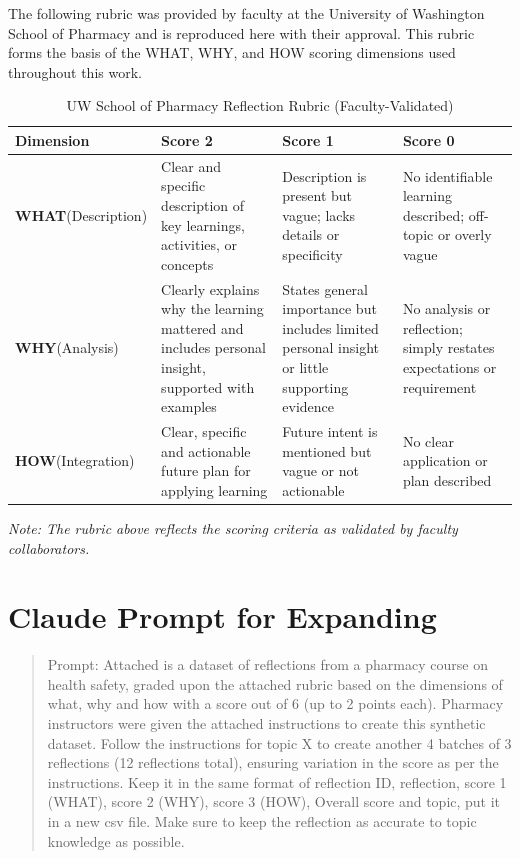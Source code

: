 \documentclass[11pt]{article}
\begin{document}
The following rubric was provided by faculty at the University of Washington School of Pharmacy and is reproduced here with their approval. This rubric forms the basis of the WHAT, WHY, and HOW scoring dimensions used throughout this work.

\vspace{1em}

\begin{table}[H]
\centering
\caption{UW School of Pharmacy Reflection Rubric (Faculty-Validated)}
\label{tab:rubric}
\begin{tabular}{p{2.2cm}p{3.8cm}p{3.8cm}p{3.8cm}}
\toprule
\textbf{Dimension} & \textbf{Score 2} & \textbf{Score 1} & \textbf{Score 0} \\
\midrule
\textbf{WHAT}\newline(Description) &
Clear and specific description of key learnings, activities, or concepts &
Description is present but vague; lacks details or specificity &
No identifiable learning described; off-topic or overly vague \\
\midrule
\textbf{WHY}\newline(Analysis) &
Clearly explains why the learning mattered and includes personal insight, supported with examples  &
States general importance but includes limited personal insight or little supporting evidence &
No analysis or reflection; simply restates expectations or requirement  \\
\midrule
\textbf{HOW}\newline(Integration) &
Clear, specific and actionable future plan for applying learning  &
Future intent is mentioned but vague or not actionable &
No clear application or plan described \\
\bottomrule
\end{tabular}
\end{table}

\noindent\textit{Note: The rubric above reflects the scoring criteria as validated by faculty collaborators.}

\section{Claude Prompt for Expanding}
\label{app:prompt}

\begin{quote}
    Prompt: Attached is a dataset of reflections from a pharmacy course on health safety, graded upon the attached rubric based on the dimensions of what, why and how with a score out of 6 (up to 2 points each). Pharmacy instructors were given the attached instructions to create this synthetic dataset. Follow the instructions for topic X to create another 4 batches of 3 reflections (12 reflections total), ensuring variation in the score as per the instructions. Keep it in the same format of reflection ID, reflection, score 1 (WHAT), score 2 (WHY), score 3 (HOW), Overall score and topic, put it in a new csv file. Make sure to keep the reflection as accurate to topic knowledge as possible.
\end{quote}
\end{document}
